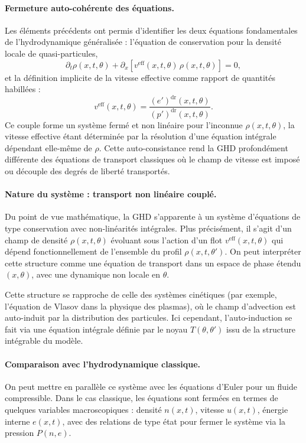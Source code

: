 \paragraph{Fermeture auto-cohérente des équations.}
Les éléments précédents ont permis d’identifier les deux équations fondamentales de l’hydrodynamique généralisée : l’équation de conservation pour la densité locale de quasi-particules,
\[
\partial_t \rho(x,t,\theta) + \partial_x \left[ v^{\mathrm{eff}}(x,t,\theta)\, \rho(x,t,\theta) \right] = 0,
\]
et la définition implicite de la vitesse effective comme rapport de quantités habillées :
\[
v^{\mathrm{eff}}(x,t,\theta) = \frac{(e')^{\mathrm{dr}}(x,t,\theta)}{(p')^{\mathrm{dr}}(x,t,\theta)}.
\]
Ce couple forme un système fermé et non linéaire pour l’inconnue $\rho(x,t,\theta)$, la vitesse effective étant déterminée par la résolution d’une équation intégrale dépendant elle-même de $\rho$. Cette auto-consistance rend la GHD profondément différente des équations de transport classiques où le champ de vitesse est imposé ou découple des degrés de liberté transportés.

\paragraph{Nature du système : transport non linéaire couplé.}
Du point de vue mathématique, la GHD s’apparente à un système d’équations de type conservation avec non-linéarités intégrales. Plus précisément, il s’agit d’un champ de densité $\rho(x,t,\theta)$ évoluant sous l’action d’un flot $v^{\mathrm{eff}}(x,t,\theta)$ qui dépend fonctionnellement de l’ensemble du profil $\rho(x,t,\theta')$. On peut interpréter cette structure comme une équation de transport dans un espace de phase étendu $(x,\theta)$, avec une dynamique non locale en $\theta$.

Cette structure se rapproche de celle des systèmes cinétiques (par exemple, l’équation de Vlasov dans la physique des plasmas), où le champ d’advection est auto-induit par la distribution des particules. Ici cependant, l’auto-induction se fait via une équation intégrale définie par le noyau $T(\theta,\theta')$ issu de la structure intégrable du modèle.

\paragraph{Comparaison avec l’hydrodynamique classique.}
On peut mettre en parallèle ce système avec les équations d’Euler pour un fluide compressible. Dans le cas classique, les équations sont fermées en termes de quelques variables macroscopiques : densité $n(x,t)$, vitesse $u(x,t)$, énergie interne $e(x,t)$, avec des relations de type état pour fermer le système via la pression $P(n,e)$.

